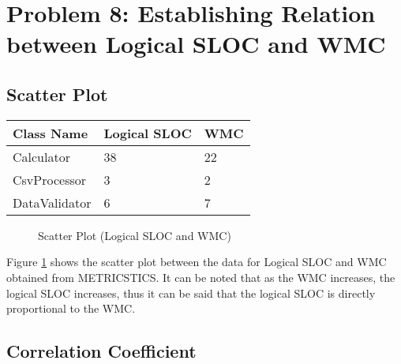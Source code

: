 \section{Problem 8: Establishing Relation between Logical SLOC and WMC}

\subsection{Scatter Plot}

\begin{table}[!htb]
\centering
\begin{tabular}{|l|l|l|}
\hline
\textbf{Class Name} & \textbf{Logical SLOC} & \textbf{WMC} \\
\hline
Calculator           & 38    & 22\\
\hline
CsvProcessor         & 3     & 2\\
\hline
DataValidator        & 6     & 7\\
\hline
\end{tabular}
\end{table}

\begin{figure}[!htb]
\centering
{}

\caption{Scatter Plot (Logical SLOC and WMC)}
\label{scatterplot}

\end{figure}

\vspace{12pt}
Figure \ref{scatterplot} shows the scatter plot between the data for Logical SLOC and WMC obtained from METRICSTICS. It can be noted that as the WMC increases, the logical SLOC increases, thus it can be said that the logical SLOC is directly proportional to the WMC.

\pagebreak
\subsection{Correlation Coefficient}

